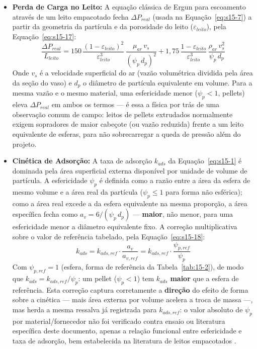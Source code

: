 \documentclass[12pt,a4paper]{article}
\numberwithin{equation}{section}
\numberwithin{table}{section}
\numberwithin{figure}{section}
\begin{document}
		\begin{itemize}
			\item \textbf{Perda de Carga no Leito:} A equação clássica de Ergun para escoamento através de um leito empacotado fecha $\Delta P_{real}$ (usada na Equação~\eqref{eq:s15-7}) a partir da geometria da partícula e da porosidade do leito ($\varepsilon_{leito}$), pela Equação~\eqref{eq:s15-17}:
			\begin{equation}\label{eq:s15-17}
			\frac{\Delta P_{real}}{L_{leito}} = 150 \, \frac{(1-\varepsilon_{leito})^2}{\varepsilon_{leito}^3} \, \frac{\mu_{ar} \, v_s}{(\psi_p \, d_p)^2} + 1{,}75 \, \frac{1-\varepsilon_{leito}}{\varepsilon_{leito}^3} \, \frac{\rho_{ar} \, v_s^2}{\psi_p \, d_p}
		\end{equation}
			Onde $v_s$ é a velocidade superficial do ar (vazão volumétrica dividida pela área da seção do vaso) e $d_p$ o diâmetro de partícula equivalente em volume. Para a mesma vazão e o mesmo material, uma esfericidade menor ($\psi_p < 1$, pellets) eleva $\Delta P_{real}$ em ambos os termos — é essa a física por trás de uma observação comum de campo: leitos de pellets extrudados normalmente exigem sopradores de maior cabeçote (ou vazão reduzida) frente a um leito equivalente de esferas, para não sobrecarregar a queda de pressão além do projeto.
			\item \textbf{Cinética de Adsorção:} A taxa de adsorção $k_{ads}$ da Equação~\eqref{eq:s15-1} é dominada pela área superficial externa disponível por unidade de volume de partícula. A esfericidade $\psi_p$ é definida como a razão entre a área da esfera de mesmo volume e a área real da partícula ($\psi_p \le 1$ para forma não esférica); como a área real excede a da esfera equivalente na mesma proporção, a área específica fecha como $a_v = 6/(\psi_p \, d_p)$ \cite{ergun} — \textbf{maior}, não menor, para uma esfericidade menor a diâmetro equivalente fixo. A correção multiplicativa sobre o valor de referência tabelado, pela Equação~\eqref{eq:s15-18}:
			\begin{equation}\label{eq:s15-18}
			k_{ads} = k_{ads,ref} \cdot \frac{a_v}{a_{v,ref}} = k_{ads,ref} \cdot \frac{\psi_{p,ref}}{\psi_p}
		\end{equation}
			Com $\psi_{p,ref} = 1$ (esfera, forma de referência da Tabela~\ref{tab:15-2}), de modo que $k_{ads} = k_{ads,ref}/\psi_p$: um pellet ($\psi_p < 1$) tem $k_{ads}$ \textbf{maior} que a esfera de referência. Esta correção captura corretamente a \textbf{direção} do efeito de forma sobre a cinética — mais área externa por volume acelera a troca de massa —, mas herda a mesma ressalva já registrada para $k_{ads,ref}$: o valor absoluto de $\psi_p$ por material/fornecedor não foi verificado contra ensaio ou literatura específica deste documento, apenas a relação funcional entre esfericidade e taxa de adsorção, bem estabelecida na literatura de leitos empacotados \cite{ergun}.
		\end{itemize}
\end{document}
